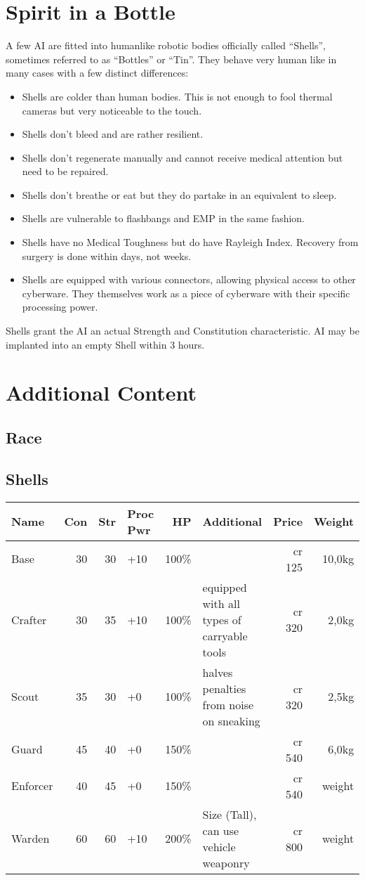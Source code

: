 \documentclass[12pt,a4paper]{book}
\begin{document}
	\chapter{Spirit in a Bottle}
	A few AI are fitted into humanlike robotic bodies officially called “Shells”, sometimes referred to as “Bottles” or “Tin”. They behave very human like in many cases with a few distinct differences:
	\begin{itemize}
		\item Shells are colder than human bodies. This is not enough to fool thermal cameras but very noticeable to the touch.
		\item Shells don’t bleed and are rather resilient.
		\item Shells don’t regenerate manually and cannot receive medical attention but need to be repaired.
		\item Shells don’t breathe or eat but they do partake in an equivalent to sleep.
		\item Shells are vulnerable to flashbangs and EMP in the same fashion.
		\item Shells have no Medical Toughness but do have Rayleigh Index. Recovery from surgery is done within days, not weeks.
		\item Shells are equipped with various connectors, allowing physical access to other cyberware. They themselves work as a piece of cyberware with their specific processing power.
	\end{itemize}
	
	Shells grant the AI an actual Strength and Constitution characteristic. AI may be implanted into an empty Shell within 3 hours.
	
	\chapter{Additional Content}
	\section{Race}
	
	\section{Shells}
	\begin{tabularx}{\textwidth}{|l|r|r|l|r|X|r|r|}
		\hline
		Name & Con & Str & Proc Pwr & HP & Additional & Price & Weight \\ \hline
		Base & 30 & 30 & +10 & 100\% & & cr 125 & 10,0kg \\ \hline
		Crafter & 30 & 35 & +10 & 100\% & equipped with all types of carryable tools & cr 320 & 2,0kg \\ \hline
		Scout & 35 & 30 & +0 & 100\% & halves penalties from noise on sneaking & cr 320 & 2,5kg \\ \hline
		Guard & 45 & 40 & +0 & 150\% & & cr 540 & 6,0kg \\ \hline
		Enforcer & 40 & 45 & +0 & 150\% & & cr 540 & weight \\ \hline
		Warden & 60 & 60 & +10 & 200\% & Size (Tall), can use vehicle weaponry & cr 800 & weight \\ \hline
	\end{tabularx}
\end{document}
